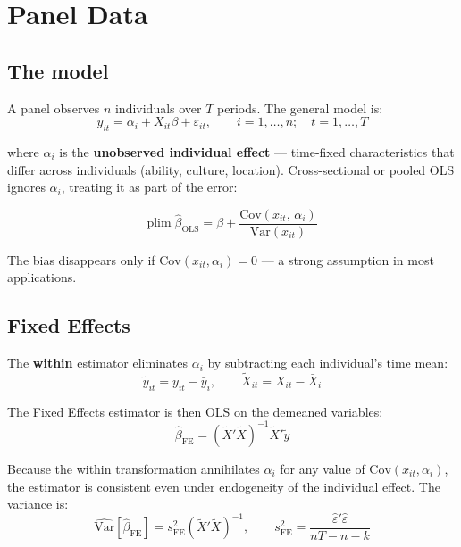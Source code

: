 \chapter{Panel Data}
\label{cap:painel}

\section{The model}

A panel observes $n$ individuals over $T$ periods. The general model is:
\[
  y_{it} = \alpha_i + X_{it}\beta + \varepsilon_{it},
  \qquad i = 1,\ldots,n;\quad t = 1,\ldots,T
\]

where $\alpha_i$ is the \textbf{unobserved individual effect} --- time-fixed
characteristics that differ across individuals (ability, culture, location).
Cross-sectional or pooled OLS ignores $\alpha_i$, treating it as part of
the error:

\[
  \mathrm{plim}\;\hat\beta_{\mathrm{OLS}}
  = \beta + \frac{\mathrm{Cov}(x_{it},\,\alpha_i)}{\mathrm{Var}(x_{it})}
\]

The bias disappears only if $\mathrm{Cov}(x_{it}, \alpha_i) = 0$ --- a strong
assumption in most applications.

\section{Fixed Effects}

The \textbf{within} estimator eliminates $\alpha_i$ by subtracting each
individual's time mean:
\[
  \tilde{y}_{it} = y_{it} - \bar{y}_i, \qquad
  \tilde{X}_{it} = X_{it} - \bar{X}_i
\]

The Fixed Effects estimator is then OLS on the demeaned variables:
\[
  \boxed{\hat\beta_{\mathrm{FE}} = (\tilde{X}'\tilde{X})^{-1}\tilde{X}'\tilde{y}}
\]

Because the within transformation annihilates $\alpha_i$ for any value of
$\mathrm{Cov}(x_{it}, \alpha_i)$, the estimator is consistent even under
endogeneity of the individual effect. The variance is:
\[
  \widehat{\mathrm{Var}}[\hat\beta_{\mathrm{FE}}] = s^2_{\mathrm{FE}}(\tilde{X}'\tilde{X})^{-1},
  \qquad
  s^2_{\mathrm{FE}} = \frac{\hat\varepsilon'\hat\varepsilon}{nT - n - k}
\]

